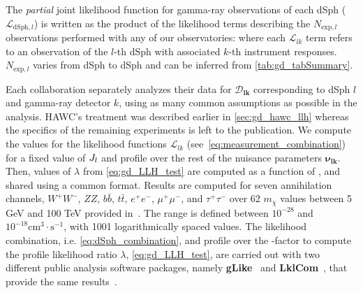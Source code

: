 The \textit{partial} joint likelihood function for gamma-ray observations of each dSph ($\mathcal{L}_{\text{dSph},l}$) is written as the product of the likelihood terms describing the $N_{\mathrm{exp},l}$ observations performed with any of our observatories:
\GDjointLLH
where each $\mathcal{L}_{lk}$ term refers to an observation of the $l$-th dSph with associated $k$-th instrument responses.
$ N_{\mathrm{exp},l} $ varies from dSph to dSph and can be inferred from \cref{tab:gd_tabSummary}.

Each collaboration separately analyzes their data for $\bm{\mathcal{D}_{lk}}$ corresponding to dSph $l$ and gamma-ray detector $k$, using as many common assumptions as possible in the analysis.
HAWC's treatment was described earlier in \cref{sec:gd_hawc_llh} whereas the specifics of the remaining experiments is left to the publication.
We compute the values for the likelihood functions $\mathcal{L}_{lk}$ (see~\cref{eq:measurement_combination}) for a fixed value of $J_l$ and profile over the rest of the nuisance parameters $\bm{\nu_{lk}}$.
Then, values of $\lambda$ from \cref{eq:gd_LLH_test} are computed as a function of \sv, and shared using a common format.
Results are computed for seven annihilation channels, $W^+W^-$, $ZZ$, $b\bar{b}$, $t\bar{t}$, $e^+e^-$, $\mu^+\mu^-$, and $\tau^+\tau^-$ over 62 $m_{\chi}$ values between 5 GeV and 100 TeV provided in~\cite{Cirelli_2011}.
The \sv range is defined between $10^{-28}$ and $10^{-18}\mathrm{cm}^{3}\cdot \mathrm{s}^{-1}$, with 1001 logarithmically spaced values.
The likelihood combination, i.e. \cref{eq:dSph_combination}, and profile over the \J-factor to compute the profile likelihood ratio $\lambda$, \cref{eq:gd_LLH_test}, are carried out with two different public analysis software packages, namely \textbf{gLike}~\cite{javier_rico_2021_4601451} and \textbf{LklCom}~\cite{tjark_miener_2021_4597500}, that provide the same results~\cite{2021arXiv211201818M}.


